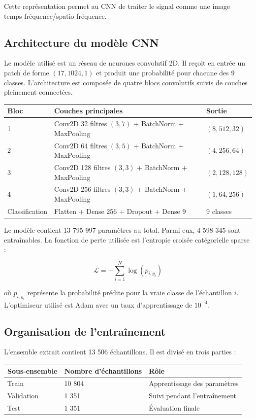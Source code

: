 \documentclass[10pt,a4paper]{article}
\begin{document}
Cette représentation permet au CNN de traiter le signal comme une image temps-fréquence/spatio-fréquence.

\subsection{Architecture du modèle CNN}

Le modèle utilisé est un réseau de neurones convolutif 2D. Il reçoit en entrée un patch de forme
$(17, 1024, 1)$ et produit une probabilité pour chacune des 9 classes. L'architecture est composée de
quatre blocs convolutifs suivis de couches pleinement connectées.

\begin{center}
\begin{tabular}{lll}
\toprule
\textbf{Bloc} & \textbf{Couches principales} & \textbf{Sortie} \\
\midrule
1 & Conv2D 32 filtres $(3,7)$ + BatchNorm + MaxPooling & $(8,512,32)$ \\
2 & Conv2D 64 filtres $(3,5)$ + BatchNorm + MaxPooling & $(4,256,64)$ \\
3 & Conv2D 128 filtres $(3,3)$ + BatchNorm + MaxPooling & $(2,128,128)$ \\
4 & Conv2D 256 filtres $(3,3)$ + BatchNorm + MaxPooling & $(1,64,256)$ \\
Classification & Flatten + Dense 256 + Dropout + Dense 9 & 9 classes \\
\bottomrule
\end{tabular}
\end{center}

Le modèle contient 13 795 997 paramètres au total. Parmi eux, 4 598 345 sont entraînables. La fonction de
perte utilisée est l'entropie croisée catégorielle sparse :

\[
\mathcal{L} = - \sum_{i=1}^{N} \log(p_{i,y_i})
\]

où $p_{i,y_i}$ représente la probabilité prédite pour la vraie classe de l'échantillon $i$.
L'optimiseur utilisé est Adam avec un taux d'apprentissage de $10^{-4}$.

\subsection{Organisation de l'entraînement}

L'ensemble extrait contient 13 506 échantillons. Il est divisé en trois parties :

\begin{center}
\begin{tabular}{lll}
\toprule
\textbf{Sous-ensemble} & \textbf{Nombre d'échantillons} & \textbf{Rôle} \\
\midrule
Train & 10 804 & Apprentissage des paramètres \\
Validation & 1 351 & Suivi pendant l'entraînement \\
Test & 1 351 & Évaluation finale \\
\bottomrule
\end{tabular}
\end{center}
\end{document}
